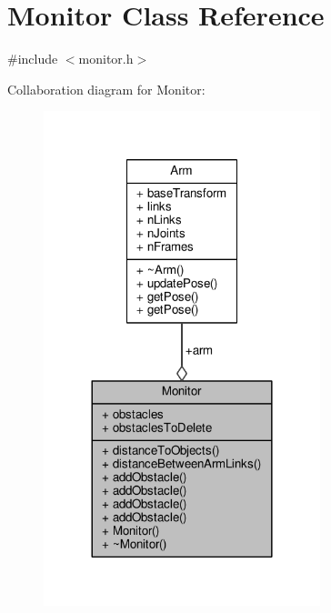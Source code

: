 \hypertarget{class_monitor}{}\section{Monitor Class Reference}
\label{class_monitor}


{\ttfamily \#include $<$monitor.\+h$>$}



Collaboration diagram for Monitor\+:
\nopagebreak
\begin{figure}[H]
\begin{center}
\leavevmode
\includegraphics[width=228pt]{class_monitor__coll__graph}
\end{center}
\end{figure}
